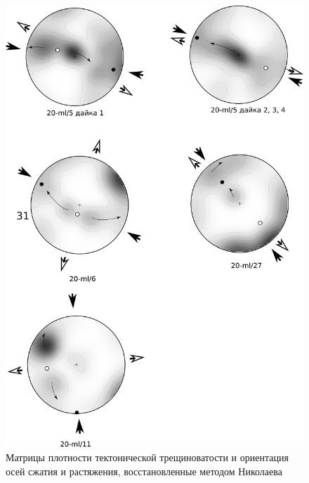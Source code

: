 \begin{figure}[H]
\begin{changemargin}{0cm}{0cm}
  \begin{center}
    \begin{minipage}[h]{0.6\linewidth}
        \includegraphics[width=1\textwidth]{authors/kondratev-fig2.png}
        \caption{Матрицы плотности тектонической трещиноватости и ориентация осей сжатия и растяжения, восстановленные методом Николаева}
        \label{fig:kondratev-fig2}
    \end{minipage}
\hfill
    \begin{minipage}[h]{0.33\linewidth}
      \begin{center}

\end{center}
\end{minipage}
\end{center}
\end{changemargin}
\end{figure}
